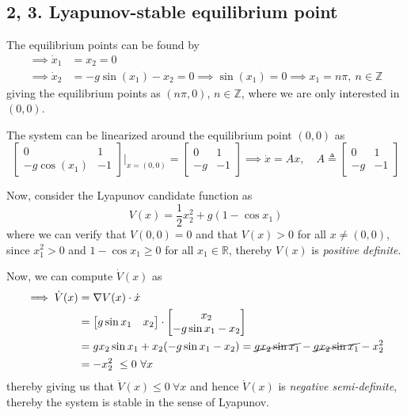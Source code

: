\subsection*{2, 3. Lyapunov-stable equilibrium point}

The equilibrium points can be found by
\begin{align*}
    \implies
    \dot{x}_{1}
     & =
    x_{2} = 0
    \\
    \implies
    \dot{x}_{2}
     & =
    -g \sin (x_{1}) - x_{2} = 0
    \implies
    \sin (x_{1}) = 0
    \implies
    x_{1} = n \pi, \ n \in \mathbb{Z}
\end{align*}
giving the equilibrium points as \( (n \pi, 0) \), \( n \in \mathbb{Z} \), where we are only interested in \( (0, 0) \).

The system can be linearized around the equilibrium point \( (0, 0) \) as
\[
    \begin{bmatrix}
        0             & 1  \\
        -g \cos (x_1) & -1
    \end{bmatrix} \Bigg|_{x = (0, 0)}
    =
    \begin{bmatrix}
        0  & 1  \\
        -g & -1
    \end{bmatrix}
    \implies
    \dot x = Ax, \quad
    A \triangleq \begin{bmatrix} 0 & 1 \\ -g & -1 \end{bmatrix}
\]

Now, consider the Lyapunov candidate function as
\[
    V(x) = \frac{1}{2} x_2^2 + g (1 - \cos x_1)
\]
where we can verify that \( V(0, 0) = 0 \) and that \( V(x) > 0 \) for all \( x \neq (0, 0) \), since \( x_1^2 > 0 \) and \( 1 - \cos x_1 \geq 0 \) for all \( x_1 \in \mathbb{R} \), thereby \( V(x) \) is \emph{positive definite}.

Now, we can compute \( \dot V(x) \) as
\begin{align*}
    \implies
    \dot V(x)
     & =
    \nabla V(x) \cdot \dot x
    \\ & =
    \begin{bmatrix} g \sin x_1 & x_2 \end{bmatrix} \cdot \begin{bmatrix} x_2 \\ -g \sin x_1 - x_2 \end{bmatrix}
    \\ & =
    g x_2 \sin x_1 + x_2 (-g \sin x_1 - x_2)
    =
    \cancel{g x_2 \sin x_1} - \cancel{g x_2 \sin x_1} - x_2^2
    \\ & =
    -x_2^2 \ \leq 0 \ \forall x
\end{align*}
thereby giving us that \( \dot V(x) \leq 0 \ \forall x \) and hence \( \dot V(x) \) is \emph{negative semi-definite}, thereby the system is stable in the sense of Lyapunov.

